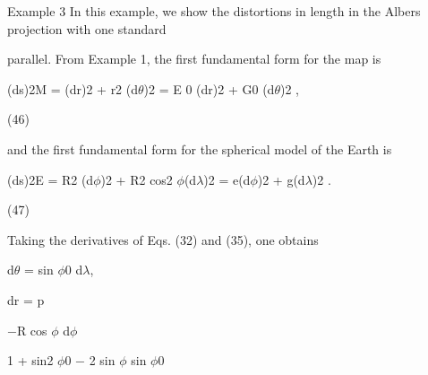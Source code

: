 \documentclass[a4paper,portrait,12pt]{article}
\begin{document}
\begin{flushleft}
Example 3 In this example, we show the distortions in length in the Albers projection with one standard
\end{flushleft}


\begin{flushleft}
parallel. From Example 1, the first fundamental form for the map is
\end{flushleft}


\begin{flushleft}
(ds)2M = (dr)2 + r2 (d$\theta$)2 = E 0 (dr)2 + G0 (d$\theta$)2 ,
\end{flushleft}





(46)





\begin{flushleft}
and the first fundamental form for the spherical model of the Earth is
\end{flushleft}


\begin{flushleft}
(ds)2E = R2 (d$\phi$)2 + R2 cos2 $\phi$(d$\lambda$)2 = e(d$\phi$)2 + g(d$\lambda$)2 .
\end{flushleft}





(47)





\begin{flushleft}
Taking the derivatives of Eqs. (32) and (35), one obtains
\end{flushleft}


\begin{flushleft}
d$\theta$ = sin $\phi$0 d$\lambda$,
\end{flushleft}





\begin{flushleft}
dr = p
\end{flushleft}





\begin{flushleft}
$-$R cos $\phi$ d$\phi$
\end{flushleft}


\begin{flushleft}
1 + sin2 $\phi$0 $-$ 2 sin $\phi$ sin $\phi$0
\end{flushleft}
\end{document}
